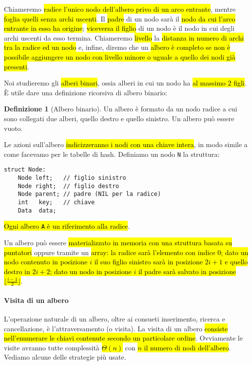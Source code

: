 \documentclass[a4paper,11pt,oneside]{article}
\theoremstyle{plain}
\theoremstyle{definition}
\newtheorem{defn}{Definizione}[section]
\theoremstyle{remark}
\begin{document}
Chiameremo \hl{radice l'unico nodo dell'albero privo di un arco entrante},
mentre \hl{foglia quelli senza archi uscenti}. Il \hl{padre} di un nodo sarà il
\hl{nodo da cui l'arco entrante in esso ha origine}; \hl{viceversa il figlio} di
un nodo è il nodo in cui degli archi uscenti da esso termina. Chiameremo
\hl{livello} la \hl{distanza in numero di archi tra la radice ed un nodo} e,
infine, diremo che un \hl{albero è completo se non è possibile aggiungere un
nodo con livello minore o uguale a quello dei nodi già presenti}.

Noi studieremo gli \hl{alberi binari}, ossia alberi in cui un nodo ha \hl{al massimo 2
figli}. È utile dare una definizione ricorsiva di albero binario:

\begin{defn}[Albero binario]\label{def:binary-tree}
  Un albero è formato da un nodo radice a cui sono collegati due alberi,
  quello destro e quello sinistro. Un albero può essere vuoto.
\end{defn}

Le azioni sull'albero \hl{indicizzeranno i nodi con una chiave intera}, in modo
simile a come facevamo per le tabelle di hash. Definiamo un nodo \texttt{N} la
struttura:

\begin{lstlisting}[language=pseudocodice,gobble=2]
  struct Node:
    Node left;   // figlio sinistro
    Node right;  // figlio destro
    Node parent; // padre (NIL per la radice)
    int   key;   // chiave
    Data  data;
\end{lstlisting}

\hl{Ogni albero \texttt{A} è un riferimento alla radice}.

Un albero può essere \hl{materializzato in memoria con una struttura basata su
puntatori} oppure tramite un \hl{array: la radice sarà l'elemento con indice 0;
dato un nodo contenuto in posizione $i$ il suo figlio sinistro sarà in posizione
$2i+1$ e quello destro in $2i + 2$; dato un nodo in posizione $i$ il padre sarà
salvato in posizione $\lfloor \frac{i-1}{2} \rfloor$}.

\paragraph{Visita di un albero} L'operazione naturale di un albero, oltre ai
consueti inserimento, ricerca e cancellazione, è l'attraversamento (o visita).
La visita di un albero \hl{consiste nell'enumerare le chiavi contenute secondo
un particolare ordine}. Ovviamente le visite avranno tutte complessità
\hl{$\Theta(n)$} con \hl{$n$ il numero di nodi dell'albero}. Vediamo alcune
delle strategie più usate.
\end{document}
